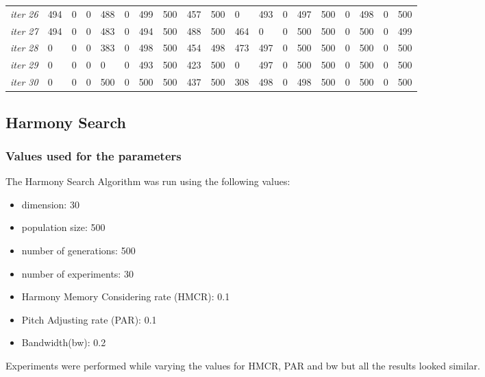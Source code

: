 \documentclass[12pt]{article}
\begin{document}
\begin{table}[ht]
{\begin{tabular}{lllllllllllllllllll}
									{\textit{iter 26}} & 494 &   0 &   0 & 488 &   0 & 499 & 500 & 457 & 500 &   0 & 493 &   0 & 497 & 500 &   0 & 498 &   0 & 500 \\ 
									{\textit{iter 27}} & 494 &   0 &   0 & 483 &   0 & 494 & 500 & 488 & 500 & 464 &   0 &   0 & 500 & 500 &   0 & 500 &   0 & 499 \\ 
									{\textit{iter 28}} &   0 &   0 &   0 & 383 &   0 & 498 & 500 & 454 & 498 & 473 & 497 &   0 & 500 & 500 &   0 & 500 &   0 & 500 \\ 
									{\textit{iter 29}} &   0 &   0 &   0 &   0 &   0 & 493 & 500 & 423 & 500 &   0 & 497 &   0 & 500 & 500 &   0 & 500 &   0 & 500 \\ 
									{\textit{iter 30}} &   0 &   0 &   0 & 500 &   0 & 500 & 500 & 437 & 500 & 308 & 498 &   0 & 498 & 500 &   0 & 500 &   0 & 500 \\ 
									\hline
								\end{tabular}
							}
					\end{table}
				
			
				
			\subsection{Harmony Search}
				
				\subsubsection{Values used for the parameters}
					The Harmony Search Algorithm was  run using  the following values:
					\begin{itemize}
						\item dimension: 30
						\item population size: 500
						\item number of generations: 500
						\item number of experiments: 30
						\item Harmony Memory Considering rate (HMCR): 0.1
						\item Pitch Adjusting rate (PAR): 0.1
						\item Bandwidth(bw): 0.2
					\end{itemize}
				
					Experiments were performed while varying the values for HMCR, PAR and bw but all the results looked similar.
				
\end{document}

